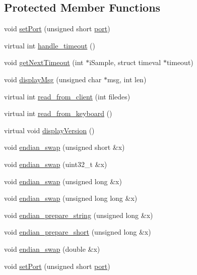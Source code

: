 \subsection*{Protected Member Functions}
\begin{DoxyCompactItemize}
\item 
void \hyperlink{classBaseServer_a6f8a3014ddd5175bcd8f6693b5dc5920}{set\-Port} (unsigned short \hyperlink{classBaseServer_a66052c095234e31cada29b678b039c68}{port})
\item 
virtual int \hyperlink{classBaseServer_a892cf59b889f59d73031108cfab07772}{handle\-\_\-timeout} ()
\item 
void \hyperlink{classBaseServer_a7144e0d3ba2ea07df19aaa45eee2f88d}{get\-Next\-Timeout} (int $\ast$i\-Sample, struct timeval $\ast$timeout)
\item 
void \hyperlink{classBaseServer_a3b0303f1db9d43aa3fcbb5ff3b1fac00}{display\-Msg} (unsigned char $\ast$msg, int len)
\item 
virtual int \hyperlink{classBaseServer_a3e649e1a9564008b2728b429bcb7e192}{read\-\_\-from\-\_\-client} (int filedes)
\item 
virtual int \hyperlink{classBaseServer_a2c5a73b3bd9950a7809ac2a353061960}{read\-\_\-from\-\_\-keyboard} ()
\item 
virtual void \hyperlink{classBaseServer_a4dade2ab6b6f0c1b1030afe1cca16af0}{display\-Version} ()
\item 
void \hyperlink{classBaseServer_a3277d0713a661a87bb64a42e7f7f9adc}{endian\-\_\-swap} (unsigned short \&x)
\item 
void \hyperlink{classBaseServer_a1f74086ad80ccab0d132b9e6ae026931}{endian\-\_\-swap} (uint32\-\_\-t \&x)
\item 
void \hyperlink{classBaseServer_a80490b4fe26e45a7de5f500af59a43e2}{endian\-\_\-swap} (unsigned long \&x)
\item 
void \hyperlink{classBaseServer_afb5c1352240c2db41febc6a666881ae3}{endian\-\_\-swap} (unsigned long long \&x)
\item 
void \hyperlink{classBaseServer_a97d6e2df8169b3f8da02099626612848}{endian\-\_\-prepare\-\_\-string} (unsigned long \&x)
\item 
void \hyperlink{classBaseServer_af4c5ce4338acc13dcf5d6e4829ba27dc}{endian\-\_\-prepare\-\_\-short} (unsigned long \&x)
\item 
void \hyperlink{classBaseServer_a6628b9fe3bc35e7814ddc2b68564c4aa}{endian\-\_\-swap} (double \&x)
\item 
void \hyperlink{classBaseServer_a6f8a3014ddd5175bcd8f6693b5dc5920}{set\-Port} (unsigned short \hyperlink{classBaseServer_a66052c095234e31cada29b678b039c68}{port})

\end{DoxyCompactItemize}

